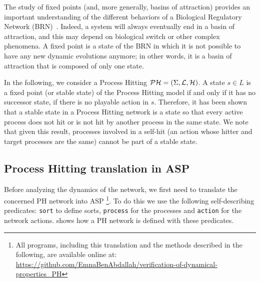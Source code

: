 The study of fixed points (and, more generally, basins of attraction) provides an important understanding of the different behaviors of a Biological Regulatory Network (BRN)~\cite{wuensche1998genomic}.
Indeed, a system will always eventually end in a basin of attraction,
and this may depend on biological switch or other complex phenomena.
A fixed point is a state of the BRN in which it is not possible to have any new dynamic evolutions anymore;
in other words, it is a basin of attraction that is composed of only one state.

In the following, we consider a Process Hitting $\mathcal{PH} = (\Sigma, \mathcal{L}, \mathcal{H})$.
A state $s \in L$ is a fixed point (or stable state) of the Process Hitting model if and only if it has no successor state, \ie if there is no playable action in $s$.
Therefore, it has been shown~\cite{PMR10-TCSB} that
a stable state in a Process Hitting network is a state so that
every active process does not hit or is not hit by another process in the same state.
We note that given this result, processes involved in a self-hit (an action whose hitter and target processes are the same) cannot be part of a stable state.

\subsection{Process Hitting translation in ASP}
Before analyzing the dynamics of the network,
we first need to translate the concerned PH network into ASP \footnote{All programs, including this translation and the methods described in the following, are available online at: \url{https://github.com/EmnaBenAbdallah/verification-of-dynamical-properties_PH}}.
To do this we use the following self-describing predicates:
\texttt{sort} to define sorts, \texttt{process} for the processes and \texttt{action} for the network actions.
 shows how a PH network is defined with these predicates.

